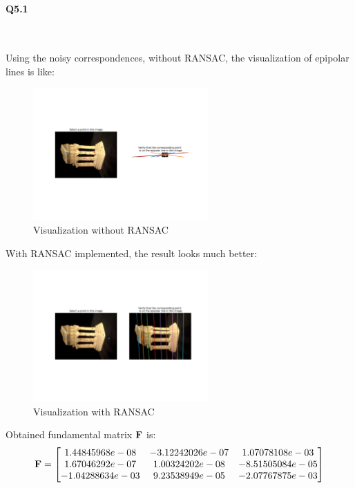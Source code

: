 \documentclass[11pt]{article} \usepackage{fullpage} \usepackage{graphicx} \usepackage{epstopdf} \usepackage{color} \usepackage{psfrag} \usepackage{pdfsync}\usepackage{indentfirst}\usepackage{subfigure}\usepackage{float}\usepackage[section]{placeins}
\begin{document}
\paragraph{Q5.1}~{}

Using the noisy correspondences, without RANSAC, the visualization of epipolar lines is like:
\begin{figure}[H]
\centering
\includegraphics[width=0.6\textwidth]{results/q5_1_without.png}
\caption{Visualization without RANSAC}
\end{figure}

With RANSAC implemented, the result looks much better:
\begin{figure}[H]
\centering
\includegraphics[width=0.6\textwidth]{results/q5_1_with.png}
\caption{Visualization with RANSAC}
\end{figure}

Obtained fundamental matrix $\bold{F}$ is:
\begin{equation}
	\bold{F} = \begin{bmatrix} 1.44845968e-08 & -3.12242026e-07 & 1.07078108e-03 \\
	1.67046292e-07 & 1.00324202e-08 & -8.51505084e-05 \\
	-1.04288634e-03 & 9.23538949e-05 & -2.07767875e-03
	\end{bmatrix}
\end{equation}
\end{document}
